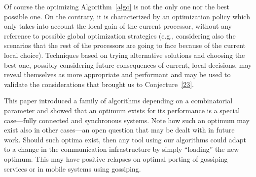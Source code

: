 \documentclass{elsart}
\begin{document}
Of course the optimizing Algorithm~\ref{algo} is not the only one nor the
best possible one.  On the contrary, it is characterized by an
optimization policy which only takes into account the local gain of the
current processor, without any reference to possible global optimization
strategies (e.g., considering also the scenarios that the rest of the
processors are going to face because of the current local choice).
Techniques based on trying alternative solutions and choosing the best
one, possibly considering future consequences of current, local decisions,
may reveal themselves as more appropriate and performant and may be used
to validate the considerations that brought us to Conjecture~\ref{23}.















This paper introduced a family of algorithms depending on a combinatorial parameter and
showed that an optimum exists for its performance is a special case---fully connected and
synchronous systems. Note how such an optimum may exist also in other cases---an open question
that may be dealt with in future work. Should such optima exist, then any tool using
our algorithms could adapt to a change in the communication infrastructure by simply
``loading'' the new optimum. This may have positive relapses on optimal porting of
gossiping services or in mobile systems using gossiping.
\end{document}
